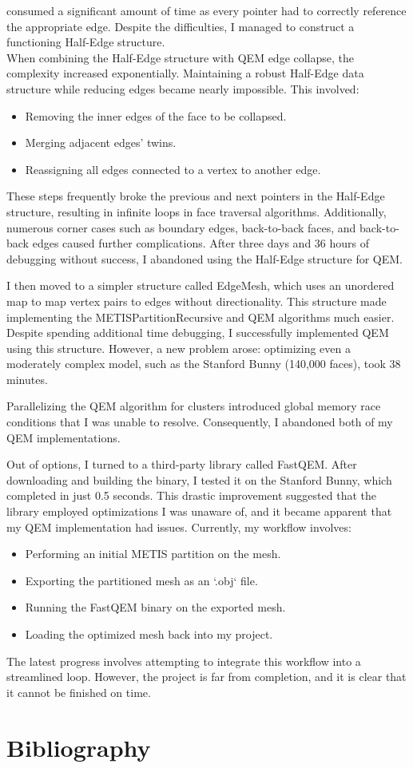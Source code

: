 \documentclass[12pt]{extarticle}
\newcommand{\customnewline}{\\[1.5em]}
\begin{document}
consumed a significant amount of time as every pointer had to correctly reference the appropriate edge. Despite the difficulties, I 
managed to construct a functioning Half-Edge structure.
\customnewline
When combining the Half-Edge structure with QEM edge collapse, the complexity increased exponentially. Maintaining a robust Half-Edge 
data structure while reducing edges became nearly impossible. This involved:
\begin{itemize}
    \item Removing the inner edges of the face to be collapsed.
    \item Merging adjacent edges' twins.
    \item Reassigning all edges connected to a vertex to another edge.
\end{itemize}
These steps frequently broke the previous and next pointers in the Half-Edge structure, resulting in infinite loops in face traversal 
algorithms. Additionally, numerous corner cases such as boundary edges, back-to-back faces, and back-to-back edges caused further 
complications. After three days and 36 hours of debugging without success, I abandoned using the Half-Edge structure for QEM.

I then moved to a simpler structure called EdgeMesh, which uses an unordered map to map vertex pairs to edges without directionality. 
This structure made implementing the METISPartitionRecursive and QEM algorithms much easier. Despite spending additional time debugging, 
I successfully implemented QEM using this structure. However, a new problem arose: optimizing even a moderately complex model, such as 
the Stanford Bunny (140,000 faces), took 38 minutes.

Parallelizing the QEM algorithm for clusters introduced global memory race conditions that I was unable to resolve. Consequently, I 
abandoned both of my QEM implementations.

Out of options, I turned to a third-party library called FastQEM. After downloading and building the binary, I tested it on the Stanford 
Bunny, which completed in just 0.5 seconds. This drastic improvement suggested that the library employed optimizations I was unaware of, 
and it became apparent that my QEM implementation had issues. Currently, my workflow involves:
\begin{itemize}
    \item Performing an initial METIS partition on the mesh.
    \item Exporting the partitioned mesh as an `.obj` file.
    \item Running the FastQEM binary on the exported mesh.
    \item Loading the optimized mesh back into my project.
\end{itemize}

The latest progress involves attempting to integrate this workflow into a streamlined loop. However, the project is far from completion, 
and it is clear that it cannot be finished on time.

\section{Bibliography}
\printbibliography
\end{document}
